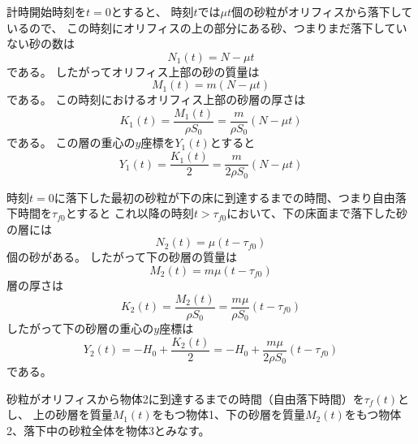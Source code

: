 \documentclass[]{article}
\begin{document}
計時開始時刻を$t=0$とすると、
時刻$t$では$\mu t$個の砂粒がオリフィスから落下しているので、
この時刻にオリフィスの上の部分にある砂、つまりまだ落下していない砂の数は
\begin{equation} \label{250703152453} 
   N_1(t) =  N - \mu t
\end{equation}
である。
したがってオリフィス上部の砂の質量は
\begin{equation} \label{250703152655} 
   M_1(t) = m (N-\mu t)
\end{equation}
である。
この時刻におけるオリフィス上部の砂層の厚さは
\begin{equation} \label{250703152748} 
   K_1(t) = \frac{M_1(t)}{\rho S_0} = \frac{m}{\rho S_0}(N-\mu t)
\end{equation}
である。
この層の重心の$y$座標を$Y_1(t)$とすると
\begin{equation} \label{250703153013} 
   Y_1(t) = \frac{K_1(t)}{2} = \frac{m}{2\rho S_0} ( N - \mu t)
\end{equation}


時刻$t=0$に落下した最初の砂粒が下の床に到達するまでの時間、つまり自由落下時間を$\tau_{f0}$とすると
これ以降の時刻$t>\tau_{f0}$において、下の床面まで落下した砂の層には
\begin{equation} \label{250703153525} 
   N_2(t) = \mu ( t - \tau_{f0})
\end{equation}
個の砂がある。
したがって下の砂層の質量は
\begin{equation} \label{250703153950} 
   M_2(t) = m\mu(t-\tau_{f0})
\end{equation}
層の厚さは
\begin{equation} \label{250703154021} 
   K_2(t) = \frac{M_2(t)}{\rho S_0} = \frac{m\mu}{\rho S_0} (t-\tau_{f0})
\end{equation}
したがって下の砂層の重心の$y$座標は
\begin{equation} \label{250703154424} 
   Y_2(t) = -H_0 + \frac{K_2(t)}{2} = -H_0 + \frac{m\mu}{2\rho S_0} (t-\tau_{f0})
\end{equation}
である。



砂粒がオリフィスから物体2に到達するまでの時間（自由落下時間）を$\tau_f(t)$とし、
上の砂層を質量$M_1(t)$をもつ物体1、下の砂層を質量$M_2(t)$をもつ物体2、落下中の砂粒全体を物体3とみなす。
\end{document}
